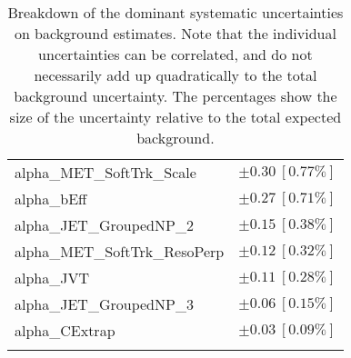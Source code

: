 \begin{table}
\begin{center}
\begin{tabular*}{\textwidth}{@{\extracolsep{\fill}}lc}
alpha\_MET\_SoftTrk\_Scale         & $\pm 0.30\ [0.77\%] $       \\
alpha\_bEff         & $\pm 0.27\ [0.71\%] $       \\
alpha\_JET\_GroupedNP\_2         & $\pm 0.15\ [0.38\%] $       \\
alpha\_MET\_SoftTrk\_ResoPerp         & $\pm 0.12\ [0.32\%] $       \\
alpha\_JVT         & $\pm 0.11\ [0.28\%] $       \\
alpha\_JET\_GroupedNP\_3         & $\pm 0.06\ [0.15\%] $       \\
alpha\_CExtrap         & $\pm 0.03\ [0.09\%] $       \\
\noalign{\smallskip}\hline\noalign{\smallskip}
\end{tabular*}
\end{center}
\caption[Breakdown of uncertainty on background estimates]{
Breakdown of the dominant systematic uncertainties on background estimates.
Note that the individual uncertainties can be correlated, and do not necessarily add up quadratically to 
the total background uncertainty. The percentages show the size of the uncertainty relative to the total expected background.
\label{table.results.bkgestimate.uncertainties.SRB_TT}}
\end{table}
%
